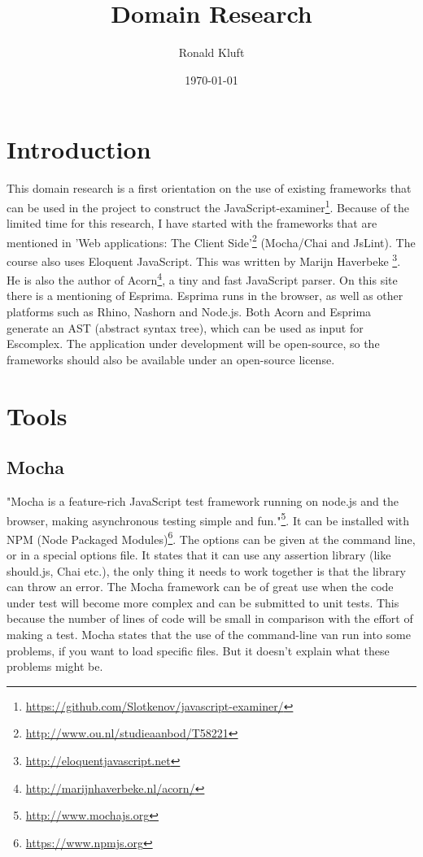 \documentclass{article}
\begin{document}
\title{Domain Research}
\author{Ronald Kluft}
\date{\today}
\maketitle

\section{Introduction}
This domain research is a first orientation on the use of existing frameworks that can be used in the 
project to construct the JavaScript-examiner\footnote{\url{https://github.com/Slotkenov/javascript-examiner/}}.
Because of the limited time for this research, I have started with the frameworks that are mentioned in 
'Web applications: The Client Side'\footnote{\url{http://www.ou.nl/studieaanbod/T58221}} (Mocha/Chai and JsLint).
The course also uses Eloquent JavaScript. This was written by Marijn Haverbeke \footnote{\url{http://eloquentjavascript.net}}.
He is also the author of Acorn\footnote{\url{http://marijnhaverbeke.nl/acorn/}}, a tiny and fast JavaScript parser.
On this site there is a mentioning of Esprima. 
Esprima runs in the browser, as well as other platforms such as Rhino, Nashorn and Node.js.
Both Acorn and Esprima generate an AST (abstract syntax tree), which can be used as input for Escomplex.
The application under development will be open-source, so the frameworks should also be available
under an open-source license.

\section{Tools}

\subsection{Mocha}
"Mocha is a feature-rich JavaScript test framework running on node.js and the 
browser, making asynchronous testing simple and fun."\footnote{\url{http://www.mochajs.org}}.
It can be installed with NPM (Node Packaged Modules)\footnote{\url{https://www.npmjs.org}}.
The options can be given at the command line, or in a special options file.
It states that it can use any assertion library (like should.js, Chai etc.), 
the only thing it needs to work together is that the library can throw an error.
The Mocha framework can be of great use when the code under test will become more complex and can be submitted to unit tests.
This because the number of lines of code will be small in comparison with the effort of making a test.
Mocha states that the use of the command-line van run into some problems, if you want to load specific files. 
But it doesn't explain what these problems might be.
\end{document}
